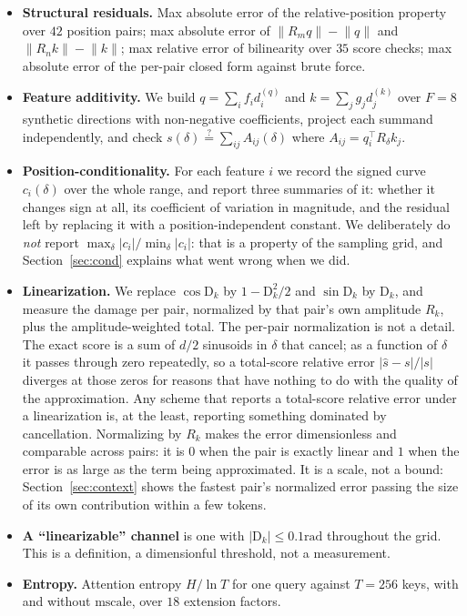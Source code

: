 \documentclass{article}
\theoremstyle{plain}
\theoremstyle{remark}
\newcommand{\R}{R}
\newcommand{\D}{\mathrm{D}_k}
\newcommand{\Rk}{R_k}
\newcommand{\half}{d/2}
\newcommand{\rad}{\mathrm{rad}}
\begin{document}
\begin{itemize}
  \itemsep2pt
  \item \textbf{Structural residuals.} Max absolute error of the
    relative-position property over $42$ position pairs; max absolute error of
    $\bigl\|\R_m q\bigr\| - \bigl\|q\bigr\|$ and
    $\bigl\|\R_n k\bigr\| - \bigl\|k\bigr\|$; max relative error of bilinearity
    over $35$ score checks; max absolute error of the per-pair closed form
    against brute force.
  \item \textbf{Feature additivity.} We build $q = \sum_i f_i d_i^{(q)}$ and
    $k = \sum_j g_j d_j^{(k)}$ over $F = 8$ synthetic directions with
    non-negative coefficients, project each summand independently, and check
    $s(\delta) \stackrel{?}{=} \sum_{ij} A_{ij}(\delta)$ where
    $A_{ij} = q_i^{\!\top}\R_{\delta}k_j$.
  \item \textbf{Position-conditionality.} For each feature $i$ we record the
    signed curve $c_i(\delta)$ over the whole range, and report three summaries of
    it: whether it changes sign at all, its coefficient of variation in
    magnitude, and the residual left by replacing it with a position-independent
    constant. We deliberately do \emph{not} report
    $\max_\delta |c_i| / \min_\delta |c_i|$: that is a property of the sampling
    grid, and Section~\ref{sec:cond} explains what went wrong when we did.
  \item \textbf{Linearization.} We replace $\cos \D$ by $1 - \D^2/2$ and
    $\sin \D$ by $\D$, and measure the damage per pair, normalized by that
    pair's own amplitude $\Rk$, plus the amplitude-weighted total. The per-pair
    normalization is not a detail. The exact score is a sum of $\half$
    sinusoids in $\delta$ that cancel; as a function of $\delta$ it passes
    through zero repeatedly, so a total-score relative error
    $\bigl|\hat s - s\bigr| / \bigl|s\bigr|$ diverges at those zeros for
    reasons that have nothing to do with the quality of the approximation. Any
    scheme that reports a total-score relative error under a linearization is,
    at the least, reporting something dominated by cancellation. Normalizing by
    $\Rk$ makes the error dimensionless and comparable across pairs: it is $0$
    when the pair is exactly linear and $1$ when the error is as large as the
    term being approximated. It is a scale, not a bound: Section~\ref{sec:context}
    shows the fastest pair's normalized error passing the size of its own
    contribution within a few tokens.
  \item \textbf{A ``linearizable'' channel} is one with $|\D| \le 0.1\rad$
    throughout the grid. This is a definition, a dimensionful threshold, not a
    measurement.
  \item \textbf{Entropy.} Attention entropy $H/\ln T$ for one query against
    $T = 256$ keys, with and without $\mathrm{mscale}$, over $18$ extension
    factors.
\end{itemize}
\end{document}
